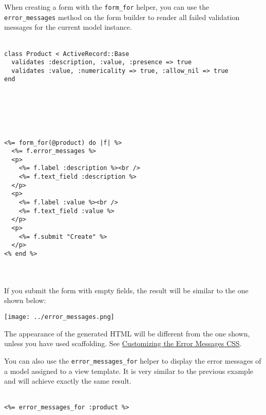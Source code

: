 \documentclass[10pt]{book}
\begin{document}
When creating a form with the \texttt{form\_for} helper, you can use the \texttt{error\_messages} method on the form builder to render all failed validation messages for the current model instance.
\\ \\
\begin{minipage}{\textwidth}{\scriptsize
\begin{verbatim}
class Product < ActiveRecord::Base
  validates :description, :value, :presence => true
  validates :value, :numericality => true, :allow_nil => true
end
\end{verbatim}}
\end{minipage}
\\ \\
\\ \\
\begin{minipage}{\textwidth}{\scriptsize
\begin{verbatim}
<%= form_for(@product) do |f| %>
  <%= f.error_messages %>
  <p>
    <%= f.label :description %><br />
    <%= f.text_field :description %>
  </p>
  <p>
    <%= f.label :value %><br />
    <%= f.text_field :value %>
  </p>
  <p>
    <%= f.submit "Create" %>
  </p>
<% end %>
\end{verbatim}}
\end{minipage}
\\ \\

If you submit the form with empty fields, the result will be similar to the one shown below:


\texttt{[image: ../error\_messages.png]}

The appearance of the generated HTML will be different from the one shown, unless you have used scaffolding. See \hyperlink{customizing-error-messages-css}{Customizing the Error Messages CSS}.

You can also use the \texttt{error\_messages\_for} helper to display  the error messages of a model assigned to a view template. It is very  similar to the previous example and will achieve exactly the same  result.
\\ \\
\begin{minipage}{\textwidth}{\scriptsize
\begin{verbatim}
<%= error_messages_for :product %>
\end{verbatim}}
\end{minipage}
\\ \\
\end{document}
